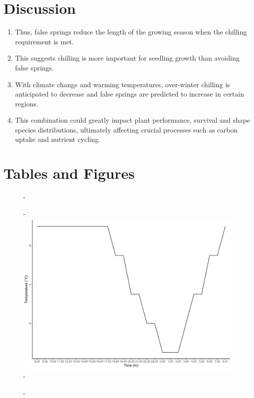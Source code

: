 \documentclass{article}\usepackage[]{graphicx}\usepackage[]{color}
\begin{document}
\section*{Discussion}
\begin{enumerate}
  \item Thus, false springs reduce the length of the growing season when the chilling requirement is met.
  \item This suggests chilling is more important for seedling growth than avoiding false springs. 
  \item With climate change and warming temperatures, over-winter chilling is anticipated to decrease and false springs are predicted to increase in certain regions. 
  \item This combination could greatly impact plant performance, survival and shape species distributions, ultimately affecting crucial processes such as carbon uptake and nutrient cycling.
  \end{enumerate}






\section*{Tables and Figures}

{\begin{figure} [H]
  -\begin{center}
  -\includegraphics[width=12cm]{..//analyses/figures/growthchamber.pdf}%
  -\end{center}
  -\end{figure}}
  
\end{document}

